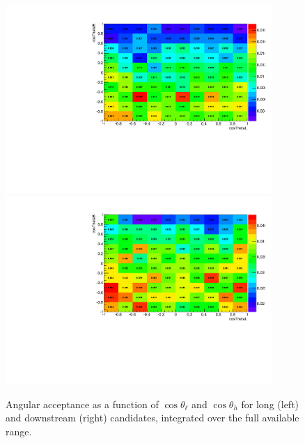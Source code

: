 \begin{figure}[h!]
\includegraphics[width=0.9\textwidth]{Lmumu/figs/efficiencies/2D/2Deff_upper_cosThetaB_vs_cosThetaL_DD.pdf}
\includegraphics[width=0.9\textwidth]{Lmumu/figs/efficiencies/2D/2Deff_upper_cosThetaB_vs_cosThetaL_LL.pdf}
\caption{Angular acceptance as a function of $\cos\theta_\ell$ and $\cos\theta_h$ for long (left) and
downstream (right) candidates, integrated over the full available \qsq range.}
\label{fig:2DcosThetaLandBeff}
\end{figure}

